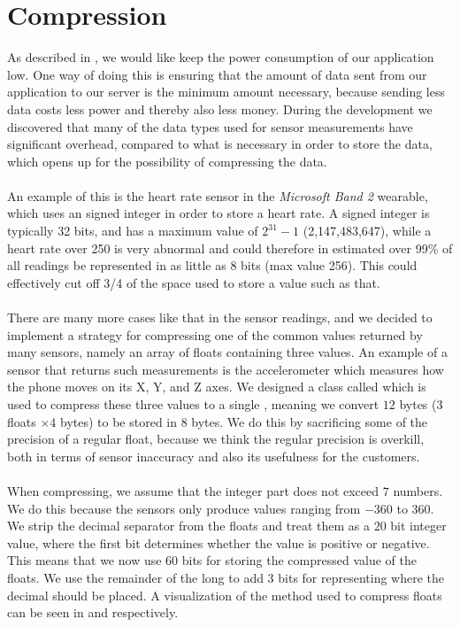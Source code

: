 
\section{Compression}
\label{sec:compression}

As described in , we would like keep the power consumption of our application low. One way of doing this is ensuring that the amount of data sent from our application to our server is the minimum amount necessary, because sending less data costs less power and thereby also less money. During the development we discovered that many of the data types used for sensor measurements have significant overhead, compared to what is necessary in order to store the data, which opens up for the possibility of compressing the data. 
\\\\
An example of this is the heart rate sensor in the \emph{Microsoft Band 2} wearable, which uses an signed integer in order to store a heart rate. A signed integer is typically 32 bits, and has a maximum value of $2^{31} - 1$ (2,147,483,647), while a heart rate over 250 is very abnormal and could therefore in estimated over 99\% of all readings be represented in as little as 8 bits (max value 256). This could effectively cut off 3/4 of the space used to store a value such as that. 
\\\\
There are many more cases like that in the sensor readings, and we decided to implement a strategy for compressing one of the common values returned by many sensors, namely an array of floats containing three values. An example of a sensor that returns such measurements is the accelerometer which measures how the phone moves on its X, Y, and Z axes. We designed a class called  which is used to compress these three values to a single , meaning we convert $12$ bytes ($3$ floats $\times 4$ bytes) to be stored in $8$ bytes. We do this by sacrificing some of the precision of a regular float, because we think the regular precision is overkill, both in terms of sensor inaccuracy and also its usefulness for the customers. 
\\\\
When compressing, we assume that the integer part does not exceed $7$ numbers. We do this because the sensors only produce values ranging from $-360$ to $360$. We strip the decimal separator from the floats and treat them as a $20$ bit integer value, where the first bit determines whether the value is positive or negative. This means that we now use $60$ bits for storing the compressed value of the floats. We use the remainder of the long to add 3 bits for representing where the decimal should be placed. A visualization of the method used to compress floats can be seen in  and  respectively.
